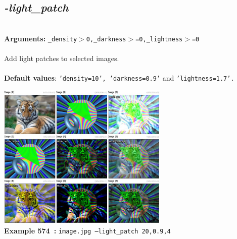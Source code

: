 \documentclass[a4paper,11pt,twoside]{book}
\begin{document}
\subsection{\emph{-light\_patch} }\vspace*{-0.5em}
~\\\textbf{Arguments: } 
{\small \texttt{\_density$>$0,\_darkness$>$=0,\_lightness$>$=0}}\\~\\
Add light patches to selected images.
~\\~\\\textbf{Default values}: {\small \texttt{'density=10', 'darkness=0.9'} and \texttt{'lightness=1.7'.}}
\begin{center}\includegraphics[keepaspectratio=true,height=7cm,width=\textwidth]{img/gmic_def574.jpg}\\
{\footnotesize \textbf{Example 574~:} \texttt{image.jpg --light\_patch 20,0.9,4}}
\end{center}
\end{document}
